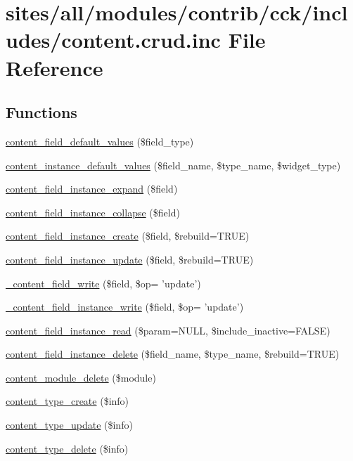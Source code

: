 \hypertarget{content_8crud_8inc}{
\section{sites/all/modules/contrib/cck/includes/content.crud.inc File Reference}
\label{content_8crud_8inc}
}
\subsection*{Functions}
\begin{CompactItemize}
\item 
\hyperlink{content_8crud_8inc_07cd3757b31f4907a1b3c9c502e17ad7}{content\_\-field\_\-default\_\-values} (\$field\_\-type)
\item 
\hyperlink{content_8crud_8inc_8df5e758ddedb3686215f05da5009b52}{content\_\-instance\_\-default\_\-values} (\$field\_\-name, \$type\_\-name, \$widget\_\-type)
\item 
\hyperlink{content_8crud_8inc_25d078351d19f7aadc913a3b6cb9ebae}{content\_\-field\_\-instance\_\-expand} (\$field)
\item 
\hyperlink{content_8crud_8inc_91ca2411f3edf5967fd2aa7a50020c0e}{content\_\-field\_\-instance\_\-collapse} (\$field)
\item 
\hyperlink{content_8crud_8inc_b0b54752706eb5a68be6ae4f329faca2}{content\_\-field\_\-instance\_\-create} (\$field, \$rebuild=TRUE)
\item 
\hyperlink{content_8crud_8inc_87fab5002b89ec0689ac287ba654f524}{content\_\-field\_\-instance\_\-update} (\$field, \$rebuild=TRUE)
\item 
\hyperlink{content_8crud_8inc_d05ab93c679203625921d1ee307369f4}{\_\-content\_\-field\_\-write} (\$field, \$op= 'update')
\item 
\hyperlink{content_8crud_8inc_245bfc4c8eb367690d65bcd02fc11e8e}{\_\-content\_\-field\_\-instance\_\-write} (\$field, \$op= 'update')
\item 
\hyperlink{content_8crud_8inc_db5f59ebcf235ed60133d755ddb6225a}{content\_\-field\_\-instance\_\-read} (\$param=NULL, \$include\_\-inactive=FALSE)
\item 
\hyperlink{content_8crud_8inc_dd40e44fb66e9a1904fbc2bf6fe0d83c}{content\_\-field\_\-instance\_\-delete} (\$field\_\-name, \$type\_\-name, \$rebuild=TRUE)
\item 
\hyperlink{content_8crud_8inc_1edd225d1bdea17dc4348de821f11aca}{content\_\-module\_\-delete} (\$module)
\item 
\hyperlink{content_8crud_8inc_132f9ba2a0c09f24076af987271a4de1}{content\_\-type\_\-create} (\$info)
\item 
\hyperlink{content_8crud_8inc_59dc0b70d227d303d61c464a53713414}{content\_\-type\_\-update} (\$info)
\item 
\hyperlink{content_8crud_8inc_a7b16645597242007c1b311d912772dc}{content\_\-type\_\-delete} (\$info)
\end{CompactItemize}


